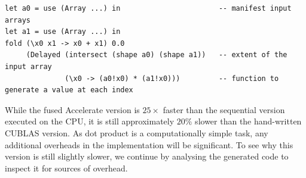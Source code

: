 \begin{lstlisting}[style=haskell]
let a0 = use (Array ...) in                       -- manifest input arrays
let a1 = use (Array ...) in
fold (\x0 x1 -> x0 + x1) 0.0
     (Delayed (intersect (shape a0) (shape a1))   -- extent of the input array
              (\x0 -> (a0!x0) * (a1!x0)))         -- function to generate a value at each index
\end{lstlisting}

While the fused Accelerate version is $25\times$ faster than the sequential
version executed on the CPU, it is still approximately $20\%$ slower than the
hand-written CUBLAS version. As dot product is a computationally simple task,
any additional overheads in the implementation will be significant. To see why
this version is still slightly slower, we continue by analysing the generated
code to inspect it for sources of overhead.


